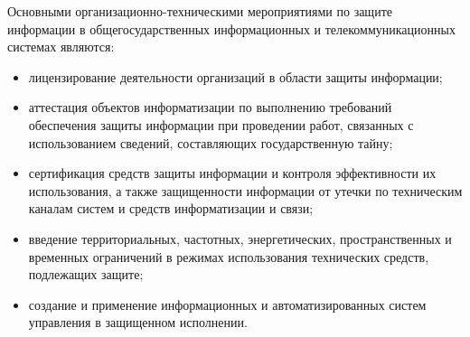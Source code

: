 Основными организационно-техническими мероприятиями по защите информации в общегосударственных информационных и телекоммуникационных системах являются:
\begin{itemize}
	\item лицензирование деятельности организаций в области защиты информации;
	\item аттестация объектов информатизации по выполнению требований обеспечения защиты информации при проведении работ, связанных с использованием сведений, составляющих государственную тайну;
	\item сертификация средств защиты информации и контроля эффективности их использования, а также защищенности информации от утечки по техническим каналам систем и средств информатизации и связи;
	\item введение территориальных, частотных, энергетических, пространственных и временных ограничений в режимах использования технических средств, подлежащих защите;
	\item создание и применение информационных и автоматизированных систем управления в защищенном исполнении.
\end{itemize}